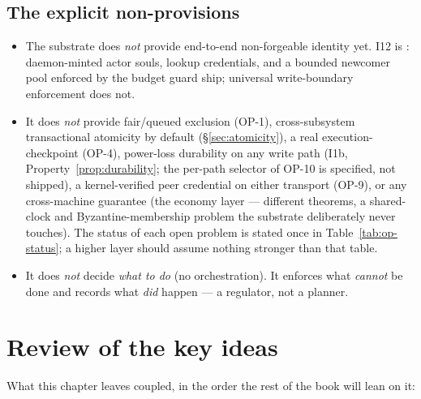 \documentclass[11pt,a4paper]{article}
\theoremstyle{definition}
\theoremstyle{remark}
\begin{document}
\subsection{The explicit non-provisions}
\begin{itemize}[leftmargin=1.4em]
  \item The substrate does \emph{not} provide end-to-end non-forgeable identity
  yet. I12 is \BuiltWeak: daemon-minted actor souls, lookup credentials, and a
  bounded newcomer pool enforced by the budget guard ship; universal
  write-boundary enforcement does not.
  \item It does \emph{not} provide fair/queued exclusion (OP-1), cross-subsystem
  transactional atomicity by default (\S\ref{sec:atomicity}), a real
  execution-checkpoint (OP-4), power-loss durability on any write path (I1b,
  Property~\ref{prop:durability}; the per-path selector of OP-10 is specified, not
  shipped), a kernel-verified peer credential on either transport (OP-9), or any
  cross-machine guarantee (the economy layer --- different theorems, a shared-clock
  and Byzantine-membership problem the substrate deliberately never touches). The
  status of each open problem is stated once in Table~\ref{tab:op-status}; a higher
  layer should assume nothing stronger than that table.
  \item It does \emph{not} decide \emph{what to do} (no orchestration). It enforces
  what \emph{cannot} be done and records what \emph{did} happen --- a regulator, not
  a planner.
\end{itemize}

\section*{Review of the key ideas}

What this chapter leaves coupled, in the order the rest of the book will lean on it:
\end{document}
